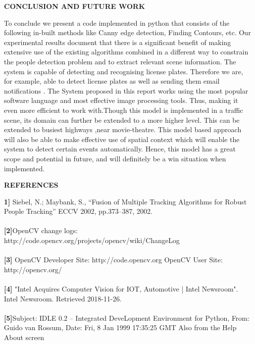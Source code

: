 \documentclass[12pt,a4paper]{report}
\begin{document}
\newpage
{}
\begin{center}
\textbf{\LARGE CONCLUSION AND FUTURE WORK}
\end{center}
\large
To conclude we present a code implemented in python that consists of the following in-built methods like Canny edge detection, Finding Contours, etc. Our experimental results document that there is a signiﬁcant beneﬁt of making extensive use of the existing algorithms combined in a different way to constrain the people detection problem and to extract relevant scene information. The system is capable of detecting and recognising license plates. Therefore we are, for example, able to detect license plates as well as sending them email notifications . The System proposed in this report works using the most popular software language and most effective image processing tools. Thus, making it even more efficient to work with.Though this model is implemented in a traffic scene, its domain can further be extended to a more higher level. This can be extended to busiest highways ,near movie-theatre. This model based approach will also be able to make effective use of spatial context which will enable the system to detect certain events automatically. Hence, this model has a great scope and potential in future, and will definitely be a win situation when implemented.



\newpage
{}
\begin{center}
\textbf{\LARGE REFERENCES}
\end{center}
\large
\textbf{1]} Siebel, N.; Maybank, S., “Fusion of Multiple Tracking Algorithms for Robust People Tracking” ECCV 2002, pp.373–387, 2002.\\\\
\textbf{[2]}OpenCV change logs: http://code.opencv.org/projects/opencv/wiki/ChangeLog\\\\
\textbf{[3]} OpenCV Developer Site: http://code.opencv.org
 OpenCV User Site: http://opencv.org/\\\\
\textbf{[4]} "Intel Acquires Computer Vision for IOT, Automotive | Intel Newsroom". Intel Newsroom. Retrieved 2018-11-26.\\\\
\textbf{[5]}Subject: IDLE 0.2 -- Integrated DeveLopment Environment for Python, From: Guido van Rossum, Date: Fri, 8 Jan 1999 17:35:25 GMT
 Also from the Help About screen
\end{document}
